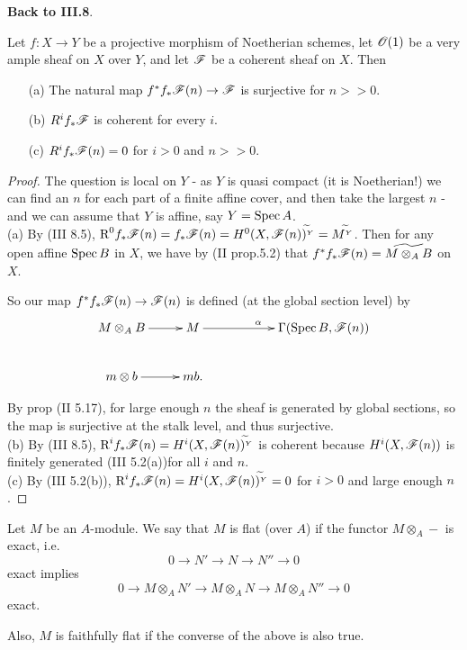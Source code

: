  \textbf{Back to III.8}.
 \begin{theorem} Let $f:X\rightarrow
Y$ be a projective morphism of Noetherian schemes, let $\mathscr{O}(1)$ be
a very ample sheaf on $X$ over $Y$, and let $\mathscr{F}$ be a coherent
sheaf on $X$. Then \begin{itemize} \item[(a)] The natural map
$f^*f_*\mathscr{F}(n)\rightarrow\mathscr{F}$ is surjective for $n>>0$. \item[(b)]
$R^if_*\mathscr{F}$ is coherent for every $i$. \item[(c)] $R^if_*\mathscr{F}(n) = 0$
for $i > 0$ and $n >> 0$. \end{itemize}
 \end{theorem}
\begin{proof} The question is local on $Y$ - as $Y$ is quasi
compact (it is Noetherian!) we can find an $n$ for each part of a
finite affine cover, and then take the largest $n$ - and we can
assume that $Y$ is
affine, say $Y = \text{\rm Spec\,}{A}$.\\

(a) By (III 8.5), $\text{R}^0f_*\mathscr{F}(n) = f_*\mathscr{F}(n) =
H^0(X,\mathscr{F}(n))^{\widetilde{}_Y} = M^{\widetilde{}_Y}$. Then for any
open affine $\text{\rm Spec\,}{B}$ in $X$, we have by (II prop.5.2) that
$f^*f_*\mathscr{F}(n) = \widetilde{M\otimes_AB}$ on $X$.

So our map $f^*f_*\mathscr{F}(n)\rightarrow\mathscr{F}(n)$ is defined (at the global
section level) by \[ \xymatrix{ M\otimes_AB \ar[r] &M
\ar[rr]^{\alpha} &&
\Gamma(\spec{B},\F(n))\\
m\otimes b \ar[r]&mb.&& } \]

By prop (II 5.17), for large enough $n$ the sheaf is generated by
global sections, so the map is surjective at the stalk level, and
thus surjective.\\

(b) By (III 8.5),  $\text{R}^if_*\mathscr{F}(n) =
H^i(X,\mathscr{F}(n))^{\widetilde{}_Y}$ is coherent because $H^i(X,\mathscr{F}(n))$
is finitely generated (III 5.2(a))for all $i$
and $n$.\\

(c) By (III 5.2(b)), $\text{R}^if_*\mathscr{F}(n) =
H^i(X,\mathscr{F}(n))^{\widetilde{}_Y} = 0$ for $i > 0$ and large enough
$n$. \end{proof}


\begin{definition}Let $M$ be an $A$-module. We say that $M$ is
flat (over $A$) if the functor $M\otimes_A -$ is exact, i.e. \[ 0
\rightarrow N' \rightarrow N \rightarrow N'' \rightarrow 0 \]
exact implies \[ 0 \rightarrow M\otimes_AN' \rightarrow
M\otimes_AN\rightarrow M\otimes_AN''\rightarrow0 \] exact.
\end{definition}
 Also, $M$ is faithfully flat if the converse of the above is also true.


